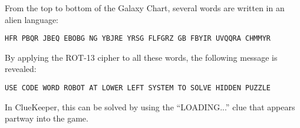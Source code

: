 From the top to bottom of the Galaxy Chart, several words are written in an
alien language:

\texttt{HFR PBQR JBEQ EBOBG NG YBJRE YRSG FLFGRZ GB FBYIR UVQQRA CHMMYR}

By applying the ROT-13 cipher to all these words, the following message
is revealed:

\texttt{USE CODE WORD ROBOT AT LOWER LEFT SYSTEM TO SOLVE HIDDEN PUZZLE}

In ClueKeeper, this can be solved by using the ``LOADING...'' clue that
appears partway into the game. 
